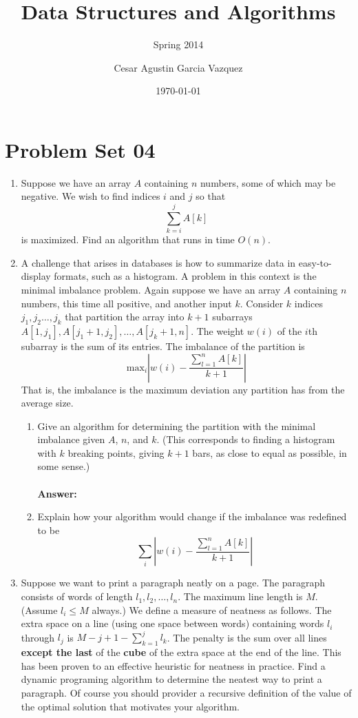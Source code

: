 \documentclass[tikz, 12pt]{scrartcl}
\title{Data Structures and Algorithms}
\subtitle{Spring 2014}
\author{Cesar Agustin Garcia Vazquez}
\date{\today}                                           %
\begin{document}
\maketitle
\section{Problem Set 04}

\begin{enumerate}
	\item Suppose we have an array $A$ containing $n$ numbers, some of which may be negative. We wish to find indices $i$ and $j$ so that
	$$\sum_{k = i}^{j}A[k]$$
is maximized. Find an algorithm that runs in time $O(n)$.

	\item A challenge that arises in databases is how to summarize data in easy-to-display formats, such as a histogram. A problem in this context is the minimal imbalance problem. Again suppose we have an array $A$ containing $n$ numbers, this time all positive, and another input $k$. 
	Consider $k$ indices $j_1, j_2 \ldots, j_k$ that partition the array into $k + 1$ subarrays $A[1, j_1], A[j_1 + 1, j_2], \ldots, A[j_k + 1, n]$. The weight $w(i)$ of the $i$th subarray is the sum of its entries. The imbalance of the partition is
	$$
	\text{max}_i \left| w(i) - \frac{\sum_{l = 1}^n A[k]}{k + 1} \right|
	$$
That is, the imbalance is the maximum deviation any partition has from the average size.\\
	\begin{enumerate}
		\item Give an algorithm for determining the partition with the minimal imbalance given $A$, $n$, and $k$. (This corresponds to finding a histogram with $k$ breaking points, giving $k + 1$ bars, as close to equal as possible, in some sense.) \\
		\\
		\textbf{Answer: }
		\begin{algorithm}
		\end{algorithm}
		\item Explain how your algorithm would change if the imbalance was redefined to be
			$$
	\sum_{i} \left| w(i) - \frac{\sum_{l = 1}^n A[k]}{k + 1} \right|
	$$
	\end{enumerate}
	\item Suppose we want to print a paragraph neatly on a page. The paragraph consists of words of length $l_1, l_2, \ldots, l_n$. The maximum line length is $M$. (Assume $l_i \leq M$ always.) We define a measure of neatness as follows. The extra space on a line (using one space between words) containing words $l_i$ through $l_j$ is $M - j + 1 - \sum_{k =1}^{j} l_k$. The penalty is the sum over all lines \textbf{except the last} of the \textbf{cube} of the extra space at the end of the line. This has been proven to an effective heuristic for neatness in practice. Find a dynamic programing algorithm to determine the neatest way to print a paragraph. Of course you should provider a recursive definition of the value of the optimal solution that motivates your algorithm.\\

\end{enumerate}
\end{document}
